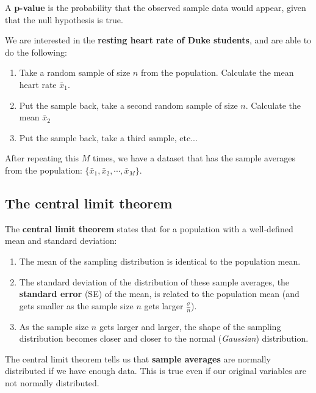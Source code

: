 \documentclass[titlepage, 12pt, leqno]{article}
\begin{document}
\begin{definition}
    A \textbf{p-value} is the probability that the observed sample data would appear, given that the null hypothesis is true.
\end{definition}


\begin{ex}
    We are interested in the \textbf{resting heart rate of Duke students}, and are able to do the following:
    \begin{enumerate}
        \item Take a random sample of size $n$ from the population. Calculate the mean heart rate $\bar{x}_1$.
        \item Put the sample back, take a second random sample of size $n$. Calculate the mean $\bar{x}_2$ 
        \item Put the sample back, take a third sample, etc...
    \end{enumerate}
   
    After repeating this $M$ times, we have a dataset that has the sample averages from the population: $\{\bar{x}_1, \bar{x}_2, \cdots , \bar{x}_M\}$.
\end{ex}

\subsection{The central limit theorem}
\begin{definition}
    The \textbf{central limit theorem} states that for a population with a well-defined mean and standard deviation:
    \begin{enumerate}
        \item The mean of the sampling distribution is identical to the population mean.
        \item The standard deviation of the distribution of these sample averages, the \textbf{standard error} (SE) of the mean, is related to the population mean (and gets smaller as the sample size $n$ gets larger $\frac{\sigma}{n}$).
        \item As the sample size $n$ gets larger and larger, the shape of the sampling distribution becomes closer and closer to the normal (\textit{Gaussian}) distribution.
    \end{enumerate}
\end{definition}
    The central limit theorem tells us that \textbf{sample averages} are normally distributed if we have enough data. This is true even if our original variables are not normally distributed.
\end{document}
